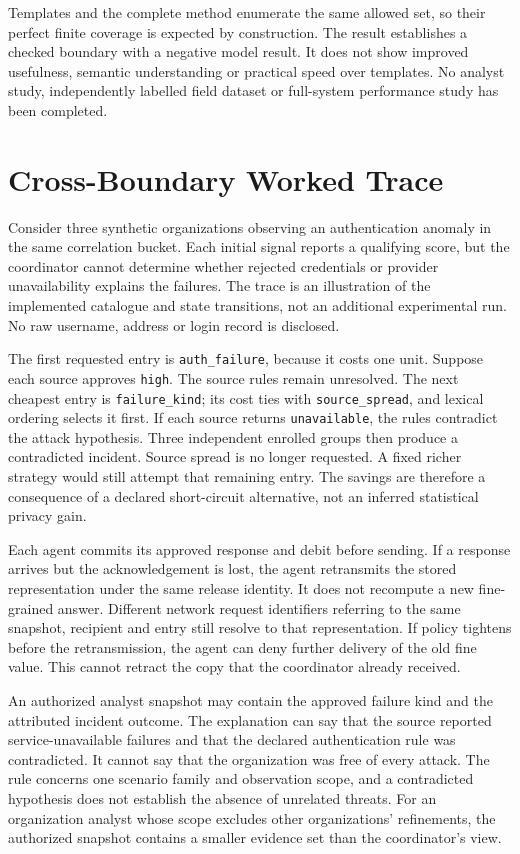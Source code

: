 \documentclass[conference,letterpaper]{IEEEtran}
\begin{document}
Templates and the complete method enumerate the same allowed set, so their perfect finite coverage is expected by construction. The result establishes a checked boundary with a negative model result. It does not show improved usefulness, semantic understanding or practical speed over templates. No analyst study, independently labelled field dataset or full-system performance study has been completed.

\section{Cross-Boundary Worked Trace}
Consider three synthetic organizations observing an authentication anomaly in the same correlation bucket. Each initial signal reports a qualifying score, but the coordinator cannot determine whether rejected credentials or provider unavailability explains the failures. The trace is an illustration of the implemented catalogue and state transitions, not an additional experimental run. No raw username, address or login record is disclosed.

The first requested entry is \texttt{auth\_failure}, because it costs one unit. Suppose each source approves \texttt{high}. The source rules remain unresolved. The next cheapest entry is \texttt{failure\_kind}; its cost ties with \texttt{source\_spread}, and lexical ordering selects it first. If each source returns \texttt{unavailable}, the rules contradict the attack hypothesis. Three independent enrolled groups then produce a contradicted incident. Source spread is no longer requested. A fixed richer strategy would still attempt that remaining entry. The savings are therefore a consequence of a declared short-circuit alternative, not an inferred statistical privacy gain.

Each agent commits its approved response and debit before sending. If a response arrives but the acknowledgement is lost, the agent retransmits the stored representation under the same release identity. It does not recompute a new fine-grained answer. Different network request identifiers referring to the same snapshot, recipient and entry still resolve to that representation. If policy tightens before the retransmission, the agent can deny further delivery of the old fine value. This cannot retract the copy that the coordinator already received.

An authorized analyst snapshot may contain the approved failure kind and the attributed incident outcome. The explanation can say that the source reported service-unavailable failures and that the declared authentication rule was contradicted. It cannot say that the organization was free of every attack. The rule concerns one scenario family and observation scope, and a contradicted hypothesis does not establish the absence of unrelated threats. For an organization analyst whose scope excludes other organizations' refinements, the authorized snapshot contains a smaller evidence set than the coordinator's view.
\end{document}
